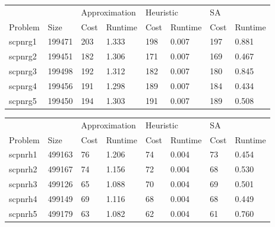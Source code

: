 \documentclass{report}
\begin{document}
\begin{table}[]
\centering
\begin{tabular}{@{}llllllll@{}}
\toprule
        &        & \multicolumn{2}{l}{Approximation} & \multicolumn{2}{l}{Heuristic} & \multicolumn{2}{l}{SA} \\
Problem & Size   & Cost           & Runtime          & Cost         & Runtime        & Cost     & Runtime     \\ \midrule
scpnrg1 & 199471 & 203            & 1.333            & 198          & 0.007          & 197      & 0.881       \\
scpnrg2 & 199451 & 182            & 1.306            & 171          & 0.007          & 169      & 0.467       \\
scpnrg3 & 199498 & 192            & 1.312            & 182          & 0.007          & 180      & 0.845       \\
scpnrg4 & 199456 & 191            & 1.298            & 189          & 0.007          & 184      & 0.434       \\
scpnrg5 & 199450 & 194            & 1.303            & 191          & 0.007          & 189      & 0.508       \\ \bottomrule
\end{tabular}
\end{table}

\begin{table}[]
\centering
\begin{tabular}{@{}llllllll@{}}
\toprule
        &        & \multicolumn{2}{l}{Approximation} & \multicolumn{2}{l}{Heuristic} & \multicolumn{2}{l}{SA} \\
Problem & Size   & Cost           & Runtime          & Cost         & Runtime        & Cost     & Runtime     \\ \midrule
scpnrh1 & 499163 & 76             & 1.206            & 74           & 0.004          & 73       & 0.454       \\
scpnrh2 & 499167 & 74             & 1.156            & 72           & 0.004          & 68       & 0.530       \\
scpnrh3 & 499126 & 65             & 1.088            & 70           & 0.004          & 69       & 0.501       \\
scpnrh4 & 499149 & 69             & 1.116            & 68           & 0.004          & 68       & 0.449       \\
scpnrh5 & 499179 & 63             & 1.082            & 62           & 0.004          & 61       & 0.760       \\ \bottomrule
\end{tabular}
\end{table}
\end{document}
